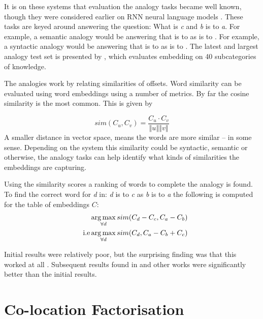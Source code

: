 \documentclass[parskip]{komatufte}
\begin{document}
It is on these systems that evaluation the analogy tasks became well known, though they were considered earlier on RNN neural language models .
These tasks are keyed around answering the question: What is  \emph{c} and \emph{b} is to \emph{a}.
For example, a semantic analogy would be answering that  is to  as  is to .
For example, a syntactic analogy would be answering that  is to  as  is to .
The latest and largest analogy test set is presented by ,
which evaluates embedding on 40 subcategories of knowledge.

The analogies work by relating similarities of offsets.
Word similarity can be evaluated using word embeddings using a number of metrics.
By far the cosine similarity is the most common.
This is given by 

\begin{equation}
sim(C_u, C_v)=\frac{C_{u}\cdot C_{v}}{\left\Vert u\right\Vert \left\Vert v\right\Vert }
\end{equation}
A smaller distance in vector space, means the words are more similar -- in some sense.
Depending on the system this similarity could be syntactic, semantic or otherwise, the analogy tasks can help identify what kinds of similarities the embeddings are capturing.

Using the similarity scores a ranking of words to complete the analogy is found.
To find the correct word for \emph{d} in: \emph{d} is to \emph{c} as \emph{b} is to \emph{a}
the following is computed for the table of embeddings $C$:
\begin{align}
\qquad & \operatorname*{arg\,max}_{\forall d} sim(C_d - C_c, C_a-C_b)\\
\text{i.e} & \operatorname*{arg\,max}_{\forall d} sim(C_d, C_a-C_b+C_c)
\end{align}



Initial results were relatively poor, but the surprising finding was that this worked at all \cite{mikolov2013linguisticsubstructures}.
Subsequent results found in  and other works were significantly better than the initial results.

\section{Co-location Factorisation}
\end{document}
